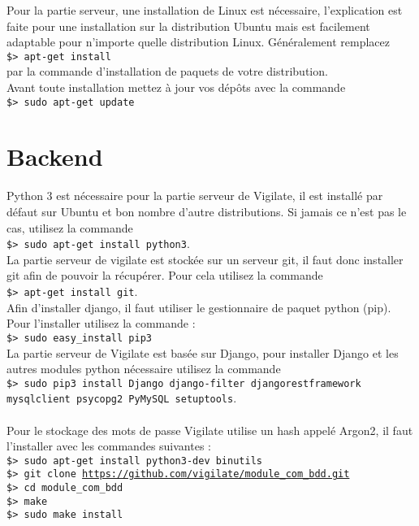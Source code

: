 Pour la partie serveur, une installation de Linux est nécessaire, l’explication est faite pour une installation sur la distribution Ubuntu mais est facilement adaptable pour n’importe quelle distribution Linux. Généralement remplacez\\
\texttt{\$> apt-get install}\\
par la commande d’installation de paquets de votre distribution.\\
Avant toute installation mettez à jour vos dépôts avec la commande\\
\texttt{\$> sudo apt-get update}\\
\section{Backend}
Python 3 est nécessaire pour la partie serveur de Vigilate, il est installé par défaut sur Ubuntu et bon nombre d’autre distributions. Si jamais ce n’est pas le cas, utilisez la commande\\
\texttt{\$> sudo apt-get install python3}.\\
La partie serveur de vigilate est stockée sur un serveur git, il faut donc installer git afin de pouvoir la récupérer. Pour cela utilisez la commande\\
\texttt{\$> apt-get install git}.\\
Afin d’installer django, il faut utiliser le gestionnaire de paquet python (pip). Pour l’installer utilisez la commande :\\
\texttt{\$> sudo easy\_install pip3}\\
La partie serveur de Vigilate est basée sur Django, pour installer Django et les autres modules python nécessaire utilisez la commande\\
\texttt{\$> sudo pip3 install Django django-filter djangorestframework mysqlclient psycopg2 PyMySQL setuptools}.\\
\\
Pour le stockage des mots de passe Vigilate utilise un hash appelé Argon2, il faut l’installer avec les commandes suivantes :\\
\texttt{\$> sudo apt-get install python3-dev binutils}\\
\texttt{\$> git clone \url{https://github.com/vigilate/module_com_bdd.git}}\\
\texttt{\$> cd module\_com\_bdd}\\
\texttt{\$> make}\\
\texttt{\$> sudo make install}\\
